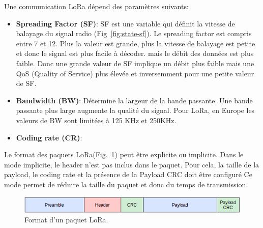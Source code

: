 Une communication LoRa dépend des paramètres suivants:
\begin{itemize}
    \item \textbf{Spreading Factor (SF)}: SF est une variable qui définit la vitesse de balayage du signal radio (Fig~\ref{fig:state-sf}). Le spreading factor est compris entre 7 et 12. Plus la valeur est grande, plus la vitesse de balayage est petite et donc le signal est plus facile à décoder. mais le débit des données est plus faible. Donc une grande valeur de SF implique un débit plus faible mais une QoS (Quality of Service) plus élevée et inversemment pour une petite valeur de SF.
    \item \textbf{Bandwidth (BW)}: Détermine la largeur de la bande passante. Une bande passante plus large augmente la qualité du signal. Pour LoRa, en Europe les valeurs de BW sont limitées à 125 KHz et 250KHz.
    \item \textbf{Coding rate (CR)}:
\end{itemize}

\vspace{1cm}
Le format des paquets LoRa(Fig.~\ref{fig:state-lora-frame-format}) peut être explicite ou implicite.
Dans le mode implicite, le header n'est pas inclus dans le paquet. Pour cela, la taille de la payload, le coding rate et la présence de la Payload CRC doit être configuré 
Ce mode permet de réduire la taille du paquet et donc du temps de transmission.

\begin{figure}[H]
    \centering
    \includegraphics[scale=0.6]{res/pictures/lora-frame-format.drawio.png}
    \caption{Format d'un paquet LoRa.}
    \label{fig:state-lora-frame-format}
\end{figure}
